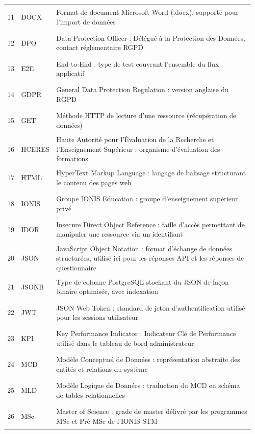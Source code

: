 \documentclass[12pt,a4paper]{report}
\begin{document}
\begin{longtable}{@{} l l >{\RaggedRight\arraybackslash}p{12.0cm} @{}}
\hypertarget{abbr-DOCX}{11} & DOCX & Format de document Microsoft Word (.docx), supporté pour l'import de données \\
\hypertarget{abbr-DPO}{12} & DPO & Data Protection Officer : Délégué à la Protection des Données, contact réglementaire RGPD \\
\hypertarget{abbr-E2E}{13} & E2E & End-to-End : type de test couvrant l'ensemble du flux applicatif \\
\hypertarget{abbr-GDPR}{14} & GDPR & General Data Protection Regulation : version anglaise du RGPD \\
\hypertarget{abbr-GET}{15} & GET & Méthode HTTP de lecture d'une ressource (récupération de données) \\
\hypertarget{abbr-HCERES}{16} & HCERES & Haute Autorité pour l'Évaluation de la Recherche et l'Enseignement Supérieur : organisme d'évaluation des formations \\
\hypertarget{abbr-HTML}{17} & HTML & HyperText Markup Language : langage de balisage structurant le contenu des pages web \\
\hypertarget{abbr-IONIS}{18} & IONIS & Groupe IONIS Education : groupe d'enseignement supérieur privé \\
\hypertarget{abbr-IDOR}{19} & IDOR & Insecure Direct Object Reference : faille d'accès permettant de manipuler une ressource via un identifiant \\
\hypertarget{abbr-JSON}{20} & JSON & JavaScript Object Notation : format d'échange de données structurées, utilisé ici pour les réponses API et les réponses de questionnaire \\
\hypertarget{abbr-JSONB}{21} & JSONB & Type de colonne PostgreSQL stockant du JSON de façon binaire optimisée, avec indexation \\
\hypertarget{abbr-JWT}{22} & JWT & JSON Web Token : standard de jeton d'authentification utilisé pour les sessions utilisateur \\
\hypertarget{abbr-KPI}{23} & KPI & Key Performance Indicator : Indicateur Clé de Performance utilisé dans le tableau de bord administrateur \\
\hypertarget{abbr-MCD}{24} & MCD & Modèle Conceptuel de Données : représentation abstraite des entités et relations du système \\
\hypertarget{abbr-MLD}{25} & MLD & Modèle Logique de Données : traduction du MCD en schéma de tables relationnelles \\
\hypertarget{abbr-MSc}{26} & MSc & Master of Science : grade de master délivré par les programmes MSc et Pré-MSc de l'IONIS-STM \\

\end{longtable}
\end{document}
